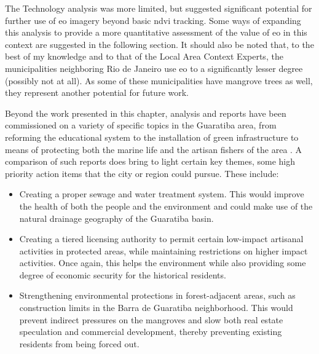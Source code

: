 The Technology analysis was more limited, but suggested significant potential for further use of \ac{eo} imagery beyond basic \ac{ndvi} tracking. Some ways of expanding this analysis to provide a more quantitative assessment of the value of \ac{eo} in this context are suggested in the following section. It should also be noted that, to the best of my knowledge and to that of the Local Area Context Experts, the municipalities neighboring Rio de Janeiro use \ac{eo} to a significantly lesser degree (possibly not at all). As some of these municipalities have mangrove trees as well, they represent another potential for future work.


Beyond the work presented in this chapter, analysis and reports have been commissioned on a variety of specific topics in the Guaratiba area, from reforming the educational system \cite{pizzolatoLOCALIZACAOESCOLASPUBLICAS2013} to the installation of green infrastructure \cite{herzogGuaratibaVerdeSubsidios2009} to means of protecting both the marine life and the artisan fishers of the area \cite{lopesTerritorialidadesEmConflitos2013}. A comparison of such reports does bring to light certain key themes, some high priority action items that the city or region could pursue. These include:

\begin{itemize}[itemsep=0pt,parsep=0pt]
	\item{Creating a proper sewage and water treatment system. This would improve the health of both the people and the environment and could make use of the natural drainage geography of the Guaratiba basin.}
	\item{Creating a tiered licensing authority to permit certain low-impact artisanal activities in protected areas, while maintaining restrictions on higher impact activities. Once again, this helps the environment while also providing some degree of economic security for the historical residents.}
	\item{Strengthening environmental protections in forest-adjacent areas, such as construction limits in the Barra de Guaratiba neighborhood. This would prevent indirect pressures on the mangroves and slow both real estate speculation and commercial development, thereby preventing existing residents from being forced out.}
\end{itemize}

